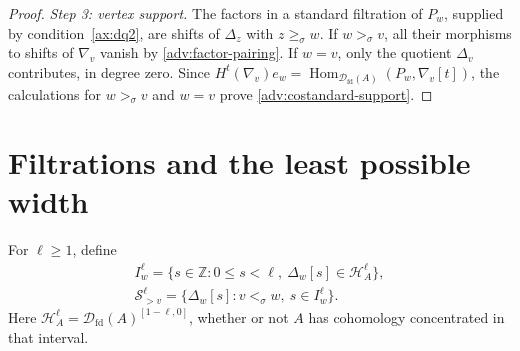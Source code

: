 \documentclass[11pt,a4paper]{article}
\newcommand{\D}{\mathcal D}
\renewcommand{\H}{\mathcal H}
\newcommand{\ZZ}{\mathbb{Z}}
\newcommand{\std}{\Delta}
\newcommand{\costd}{\nabla}
\DeclareMathOperator{\fd}{fd}
\DeclareMathOperator{\Hom}{Hom}
\theoremstyle{plain}
\theoremstyle{definition}
\numberwithin{equation}{section}
\begin{document}
\begin{proof}
\noindent\textit{Step 3: vertex support.}
The factors in a standard filtration of $P_w$, supplied by
condition~\ref{ax:dq2}, are shifts of $\std_z$ with $z\geq_\sigma w$.
If $w>_\sigma v$, all their morphisms to shifts of
$\costd_v$ vanish by \eqref{adv:factor-pairing}.
If $w=v$, only the quotient $\std_v$ contributes, in degree zero.
Since $H^t(\costd_v)e_w=
\Hom_{\D_{\fd}(A)}(P_w,\costd_v[t])$, the calculations for
$w>_\sigma v$ and $w=v$ prove
\eqref{adv:costandard-support}.
\end{proof}

\section{Filtrations and the least possible width}\label{adv:filtration-section}

For $\ell\geq1$, define
\begin{equation}\label{adv:allowed}
 \begin{gathered}
 I_w^\ell=\{s\in\ZZ:0\leq s<\ell,\ \std_w[s]\in\H_A^\ell\},\\
 \mathcal S_{>v}^\ell
 =\{\std_w[s]:v<_\sigma w,\ s\in I_w^\ell\}.
 \end{gathered}
\end{equation}
Here $\H_A^\ell=\D_{\fd}(A)^{[1-\ell,0]}$, whether or not $A$ has
cohomology concentrated in that interval.
\end{document}
